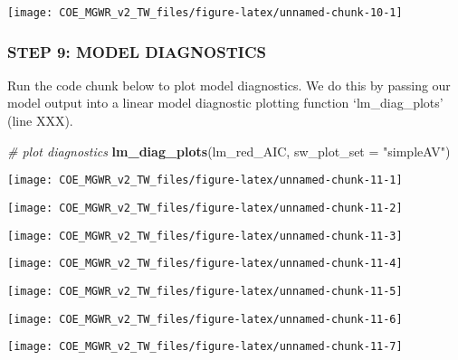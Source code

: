 \documentclass[
  12pt,
]{article}
\newenvironment{Shaded}{\begin{snugshade}}{\end{snugshade}}
\newcommand{\AttributeTok}[1]{\textcolor[rgb]{0.13,0.29,0.53}{#1}}
\newcommand{\CommentTok}[1]{\textcolor[rgb]{0.56,0.35,0.01}{\textit{#1}}}
\newcommand{\FunctionTok}[1]{\textcolor[rgb]{0.13,0.29,0.53}{\textbf{#1}}}
\newcommand{\NormalTok}[1]{#1}
\newcommand{\StringTok}[1]{\textcolor[rgb]{0.31,0.60,0.02}{#1}}
\begin{document}
\begin{center}\texttt{[image: COE\_MGWR\_v2\_TW\_files/figure-latex/unnamed-chunk-10-1]} \end{center}

\hypertarget{step-9-model-diagnostics}{%
\subsubsection{STEP 9: MODEL
DIAGNOSTICS}\label{step-9-model-diagnostics}}

Run the code chunk below to plot model diagnostics. We do this by
passing our model output into a linear model diagnostic plotting
function `lm\_diag\_plots' (line XXX).

\begin{Shaded}
\begin{Highlighting}[]
\CommentTok{\# plot diagnostics}
\FunctionTok{lm\_diag\_plots}\NormalTok{(lm\_red\_AIC, }\AttributeTok{sw\_plot\_set =} \StringTok{"simpleAV"}\NormalTok{)}
\end{Highlighting}
\end{Shaded}

\begin{center}\texttt{[image: COE\_MGWR\_v2\_TW\_files/figure-latex/unnamed-chunk-11-1]} \end{center}

\begin{center}\texttt{[image: COE\_MGWR\_v2\_TW\_files/figure-latex/unnamed-chunk-11-2]} \end{center}

\begin{center}\texttt{[image: COE\_MGWR\_v2\_TW\_files/figure-latex/unnamed-chunk-11-3]} \end{center}

\begin{center}\texttt{[image: COE\_MGWR\_v2\_TW\_files/figure-latex/unnamed-chunk-11-4]} \end{center}

\begin{center}\texttt{[image: COE\_MGWR\_v2\_TW\_files/figure-latex/unnamed-chunk-11-5]} \end{center}

\begin{center}\texttt{[image: COE\_MGWR\_v2\_TW\_files/figure-latex/unnamed-chunk-11-6]} \end{center}

\begin{center}\texttt{[image: COE\_MGWR\_v2\_TW\_files/figure-latex/unnamed-chunk-11-7]} \end{center}
\end{document}
